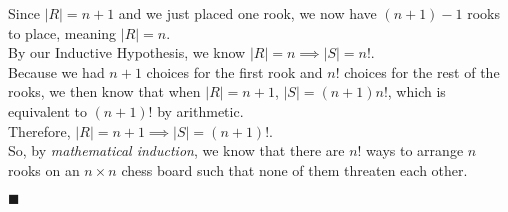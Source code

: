 \documentclass[11pt,a4paper]{article}
\begin{document}
\begin{enumerate}
    Since $|R| = n + 1 $ and we just placed one rook, we now have $(n + 1) - 1 $ rooks to place, meaning $|R| = n $. \\
    By our Inductive Hypothesis, we know $|R| = n \implies |S| = n! $. \\
    Because we had $n + 1 $ choices for the first rook and $n! $ choices for the rest of the rooks, we then know that when $|R| = n +1 $, $|S| = (n + 1)n!$, which is equivalent to $(n + 1)! $ by arithmetic. \\
    Therefore, $|R| = n + 1 \implies |S| = (n + 1)! $. \\
    So, by \emph{mathematical induction}, we know that there are $n!$ ways to arrange $n$ rooks on an $n \times n $ chess board such that none of them threaten each other.     
    \begin{flushright}
      $\blacksquare$
    \end{flushright}
    

\end{enumerate}
\end{document}
